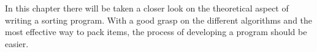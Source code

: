 In this chapter there will be taken a closer look on the theoretical aspect of writing a sorting program.
With a good grasp on the different algorithms and the most effective way to pack items, the process of developing a program should be easier.